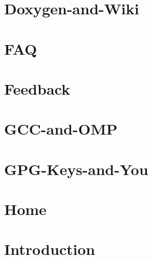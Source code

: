 \documentclass[twoside]{book}
\begin{document}
\chapter{Doxygen-\/and-\/\-Wiki}
\label{md__home_kodemonkey_workspace__t_s_g_l_docs-wiki__doxygen-and-_wiki}
\hypertarget{md__home_kodemonkey_workspace__t_s_g_l_docs-wiki__doxygen-and-_wiki}{}

\chapter{F\-A\-Q}
\label{md__home_kodemonkey_workspace__t_s_g_l_docs-wiki__f_a_q}
\hypertarget{md__home_kodemonkey_workspace__t_s_g_l_docs-wiki__f_a_q}{}

\chapter{Feedback}
\label{md__home_kodemonkey_workspace__t_s_g_l_docs-wiki__feedback}
\hypertarget{md__home_kodemonkey_workspace__t_s_g_l_docs-wiki__feedback}{}

\chapter{G\-C\-C-\/and-\/\-O\-M\-P}
\label{md__home_kodemonkey_workspace__t_s_g_l_docs-wiki__g_c_c-and-_o_m_p}
\hypertarget{md__home_kodemonkey_workspace__t_s_g_l_docs-wiki__g_c_c-and-_o_m_p}{}

\chapter{G\-P\-G-\/\-Keys-\/and-\/\-You}
\label{md__home_kodemonkey_workspace__t_s_g_l_docs-wiki__g_p_g-_keys-and-_you}
\hypertarget{md__home_kodemonkey_workspace__t_s_g_l_docs-wiki__g_p_g-_keys-and-_you}{}

\chapter{Home}
\label{md__home_kodemonkey_workspace__t_s_g_l_docs-wiki__home}
\hypertarget{md__home_kodemonkey_workspace__t_s_g_l_docs-wiki__home}{}

\chapter{Introduction}
\label{md__home_kodemonkey_workspace__t_s_g_l_docs-wiki__installing-_t_s_g_l}
\hypertarget{md__home_kodemonkey_workspace__t_s_g_l_docs-wiki__installing-_t_s_g_l}{}

\end{document}
